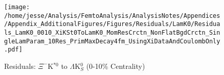 \documentclass[/home/jesse/Analysis/FemtoAnalysis/AnalysisNotes/AnalysisNoteJBuxton.tex]{subfiles}
\begin{document}
\begin{figure}[h]
  \centering
  \texttt{[image: /home/jesse/Analysis/FemtoAnalysis/AnalysisNotes/Appendices/Appendix\_AdditionalFigures/Figures/Residuals/LamK0/Residuals\_LamK0\_0010\_XiKSt0ToLamK0\_MomResCrctn\_NonFlatBgdCrctn\_SingleLamParam\_10Res\_PrimMaxDecay4fm\_UsingXiDataAndCoulombOnly.pdf]}
  \caption[Residuals: $\Xi^{-}$K$^{*0}$ to $\Lambda$K$^{0}_{S}$ (0-10\% Centrality)]{Residuals: $\Xi^{-}$K$^{*0}$ to $\Lambda$K$^{0}_{S}$ (0-10\% Centrality)}
  \label{fig:Res_LamK0_0010_XiCKSt0}
\end{figure}
\end{document}
